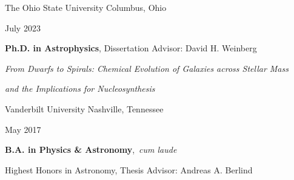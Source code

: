 \documentclass[cv.tex]{subfiles}
\begin{document}
{\color{themecolor}\large The Ohio State University}
\hfill
Columbus, Ohio
\par\noindent
\parbox{0.18\textwidth}{%
	\raggedleft
	July 2023 \par
	\null \par
	\null
}
\hspace{1mm}
\parbox{0.8\textwidth}{%
	\textbf{Ph.D. in Astrophysics}, Dissertation Advisor: David H. Weinberg
	\par
	\textit{From Dwarfs to Spirals: Chemical Evolution of
	Galaxies across Stellar Mass} \par
	\textit{and the Implications for Nucleosynthesis} \par
}
\vspace{2mm}
\par\noindent
{\color{themecolor}\large Vanderbilt University}
\hfill
Nashville, Tennessee
\par\noindent
\parbox{0.18\textwidth}{%
	\raggedleft
	May 2017 \par
	\null
}
\hspace{1mm}
\parbox{0.8\textwidth}{%
	\vspace{1mm}
	\textbf{B.A. in Physics \& Astronomy},~\textit{cum laude} \par
	Highest Honors in Astronomy, Thesis Advisor: Andreas A. Berlind
}
\end{document}
